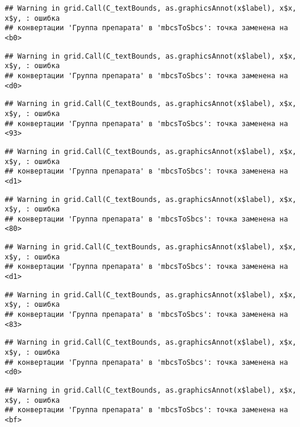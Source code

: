 \documentclass[
]{article}
\begin{document}
\begin{verbatim}
## Warning in grid.Call(C_textBounds, as.graphicsAnnot(x$label), x$x, x$y, : ошибка
## конвертации 'Группа препарата' в 'mbcsToSbcs': точка заменена на <b0>
\end{verbatim}

\begin{verbatim}
## Warning in grid.Call(C_textBounds, as.graphicsAnnot(x$label), x$x, x$y, : ошибка
## конвертации 'Группа препарата' в 'mbcsToSbcs': точка заменена на <d0>
\end{verbatim}

\begin{verbatim}
## Warning in grid.Call(C_textBounds, as.graphicsAnnot(x$label), x$x, x$y, : ошибка
## конвертации 'Группа препарата' в 'mbcsToSbcs': точка заменена на <93>
\end{verbatim}

\begin{verbatim}
## Warning in grid.Call(C_textBounds, as.graphicsAnnot(x$label), x$x, x$y, : ошибка
## конвертации 'Группа препарата' в 'mbcsToSbcs': точка заменена на <d1>
\end{verbatim}

\begin{verbatim}
## Warning in grid.Call(C_textBounds, as.graphicsAnnot(x$label), x$x, x$y, : ошибка
## конвертации 'Группа препарата' в 'mbcsToSbcs': точка заменена на <80>
\end{verbatim}

\begin{verbatim}
## Warning in grid.Call(C_textBounds, as.graphicsAnnot(x$label), x$x, x$y, : ошибка
## конвертации 'Группа препарата' в 'mbcsToSbcs': точка заменена на <d1>
\end{verbatim}

\begin{verbatim}
## Warning in grid.Call(C_textBounds, as.graphicsAnnot(x$label), x$x, x$y, : ошибка
## конвертации 'Группа препарата' в 'mbcsToSbcs': точка заменена на <83>
\end{verbatim}

\begin{verbatim}
## Warning in grid.Call(C_textBounds, as.graphicsAnnot(x$label), x$x, x$y, : ошибка
## конвертации 'Группа препарата' в 'mbcsToSbcs': точка заменена на <d0>
\end{verbatim}

\begin{verbatim}
## Warning in grid.Call(C_textBounds, as.graphicsAnnot(x$label), x$x, x$y, : ошибка
## конвертации 'Группа препарата' в 'mbcsToSbcs': точка заменена на <bf>
\end{verbatim}
\end{document}
